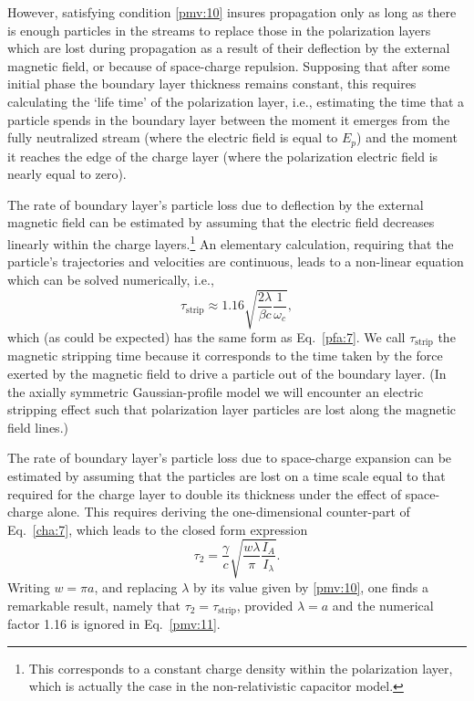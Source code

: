 \documentclass [12pt,a4paper,     ]{report} %
\begin{document}
 

   However, satisfying condition \eqref{pmv:10} insures propagation only as long as there is enough particles in the streams to replace those in the polarization layers which are lost during propagation as a result of their deflection by the external magnetic field, or because of space-charge repulsion.  Supposing that after some initial phase the boundary layer thickness remains constant, this requires calculating the `life time' of the polarization layer, i.e., estimating the time that a particle spends in the boundary layer between the moment it emerges from the fully neutralized stream (where the electric field is equal to $E_p$) and the moment it reaches the edge of the charge layer (where the polarization electric field is nearly equal to zero).

   The rate of boundary layer's particle loss due to deflection by the external magnetic field can be estimated by assuming that the electric field decreases linearly within the charge layers.\footnote{This corresponds to a constant charge density within the polarization layer, which is actually the case in the non-relativistic capacitor model.}  An elementary calculation, requiring that the particle's trajectories and velocities are continuous, leads to a non-linear equation which can be solved numerically, i.e., 
%
\begin{equation}\label{pmv:11} 
   \tau_{\text{strip}} \approx
                  1.16 \sqrt{ \frac{2\lambda}{\beta c} \frac{1}{\omega_c} },
\end{equation}
%
which (as could be expected) has the same form as Eq.~\eqref{pfa:7}.  We call $\tau_{\text{strip}}$ the magnetic stripping time because it corresponds to the time taken by the force exerted by the magnetic field to drive a particle out of the boundary layer. (In the axially symmetric Gaussian-profile model we will encounter an electric stripping effect such that polarization layer particles are lost along the magnetic field lines.)

   The rate of boundary layer's particle loss due to space-charge expansion can be estimated by assuming that the particles are lost on a time scale equal to that required for the charge layer to double its thickness under the effect of space-charge alone.  This requires deriving the one-dimensional counter-part of Eq.~\eqref{cha:7}, which leads to the closed form expression
%
\begin{equation}\label{pmv:12} %
         \tau_2 = \frac{\gamma}{c} 
                  \sqrt{\frac{w\lambda}{\pi} \frac{I_A}{I_\lambda}}.
\end{equation}
%
Writing $w=\pi a$, and replacing $\lambda$ by its value given by \eqref{pmv:10}, one finds a remarkable result, namely that $\tau_2=\tau_{\text{strip}}$, provided $\lambda = a$ and the numerical factor 1.16 is ignored in Eq.~\eqref{pmv:11}.
\end{document}
